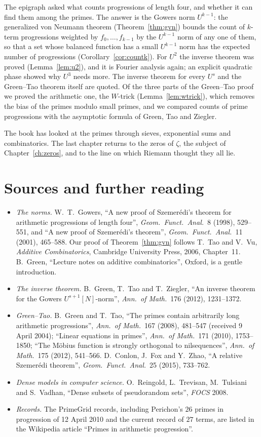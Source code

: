 The epigraph asked what counts progressions of length four, and whether it can find them among the primes. The answer is the Gowers norm $U^{k-1}$: the generalized von Neumann theorem (Theorem~\ref{thm:gvn}) bounds the count of $k$-term progressions weighted by $f_0,\dots,f_{k-1}$ by the $U^{k-1}$ norm of any one of them, so that a set whose balanced function has a small $U^{k-1}$ norm has the expected number of progressions (Corollary~\ref{cor:countk}). For $U^2$ the inverse theorem was proved (Lemma~\ref{lem:u2}), and it is Fourier analysis again; an explicit quadratic phase showed why $U^3$ needs more. The inverse theorem for every $U^s$ and the Green--Tao theorem itself are quoted. Of the three parts of the Green--Tao proof we proved the arithmetic one, the $W$-trick (Lemma~\ref{lem:wtrick}), which removes the bias of the primes modulo small primes, and we compared counts of prime progressions with the asymptotic formula of Green, Tao and Ziegler.

The book has looked at the primes through sieves, exponential sums and combinatorics. The last chapter returns to the zeros of $\zeta$, the subject of Chapter~\ref{ch:zeros}, and to the line on which Riemann thought they all lie.

\section*{Sources and further reading}

\begin{itemize}
\item \emph{The norms.} W.~T.~Gowers, ``A new proof of Szemerédi's theorem for arithmetic progressions of length four'', \emph{Geom.\ Funct.\ Anal.}\ 8 (1998), 529--551, and ``A new proof of Szemerédi's theorem'', \emph{Geom.\ Funct.\ Anal.}\ 11 (2001), 465--588. Our proof of Theorem~\ref{thm:gvn} follows T.~Tao and V.~Vu, \emph{Additive Combinatorics}, Cambridge University Press, 2006, Chapter~11. B.~Green, ``Lecture notes on additive combinatorics'', Oxford, is a gentle introduction.
\item \emph{The inverse theorem.} B.~Green, T.~Tao and T.~Ziegler, ``An inverse theorem for the Gowers $U^{s+1}[N]$-norm'', \emph{Ann.\ of Math.}\ 176 (2012), 1231--1372.
\item \emph{Green--Tao.} B.~Green and T.~Tao, ``The primes contain arbitrarily long arithmetic progressions'', \emph{Ann.\ of Math.}\ 167 (2008), 481--547 (received 9 April 2004); ``Linear equations in primes'', \emph{Ann.\ of Math.}\ 171 (2010), 1753--1850; ``The Möbius function is strongly orthogonal to nilsequences'', \emph{Ann.\ of Math.}\ 175 (2012), 541--566. D.~Conlon, J.~Fox and Y.~Zhao, ``A relative Szemerédi theorem'', \emph{Geom.\ Funct.\ Anal.}\ 25 (2015), 733--762.
\item \emph{Dense models in computer science.} O.~Reingold, L.~Trevisan, M.~Tulsiani and S.~Vadhan, ``Dense subsets of pseudorandom sets'', \emph{FOCS} 2008.
\item \emph{Records.} The PrimeGrid records, including Perichon's $26$ primes in progression of 12 April 2010 and the current record of $27$ terms, are listed in the Wikipedia article ``Primes in arithmetic progression''.
\end{itemize}
